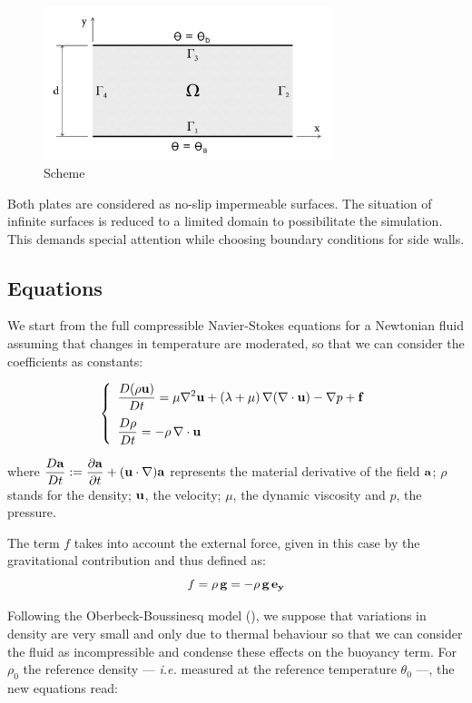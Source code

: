\documentclass[12pt,oneside]{article}
\newcommand{\ddt}[1]{\displaystyle\frac{\partial {#1}}{\partial t}} 	%
\newcommand{\DDt}[1]{\displaystyle\frac{D {#1}}{D t}} 					%
\newcommand{\divergence}[1]{\nabla\cdot{#1}} 							%
\newcommand{\gradient}[1]{\nabla{#1}} 									%
\newcommand{\laplacian}[1]{\nabla^2{#1}} 								%
\begin{document}
\begin{figure}[ht]
 \centering
 \includegraphics[width=0.75\textwidth]{scheme}
 \caption{Scheme}
 \label{fig:scheme}
\end{figure}

Both plates are considered as no-slip impermeable surfaces. The situation of infinite surfaces is reduced to a limited domain to possibilitate the simulation. This demands special attention while choosing boundary conditions for side walls.


\subsection{Equations}
We start from the full compressible Navier-Stokes equations for a Newtonian fluid assuming that changes in temperature are moderated, so that we can consider the coefficients as constants:

\begin{equation}\nonumber\left\{
\begin{array}{l}
\DDt{(\rho\bf{u})} = \mu \laplacian{\bf{u}} + (\lambda + \mu) \, \gradient{(\divergence{\bf{u}})} - \gradient{p} + {\bf{f}} \\[10pt]
\DDt{\rho} = - \rho \, \divergence{\bf{u}}
\end{array}\right.
\end{equation}

where $\DDt{\bf{a}} := \ddt{\bf{a}} + (\bf{u}\cdot \nabla)\bf{a}$ represents the material derivative of the field $\bf{a}$; $\rho$ stands for the density; $\bf{u}$, the velocity; $\mu$, the dynamic viscosity and $p$, the pressure.

The term $f$ takes into account the external force, given in this case by the gravitational contribution and thus defined as:
$$f = \rho \, \bf{g} = - \rho \, g \, \bf{e_y}$$

Following the Oberbeck-Boussinesq model (\cite{chandra}), we suppose that variations in density are very small and only due to thermal behaviour so that we can consider the fluid as incompressible and condense these effects on the buoyancy term. For $\rho_0$ the reference density --- {\it{i.e.}} measured at the reference temperature $\theta_0$ ---, the new equations read:
\end{document}
